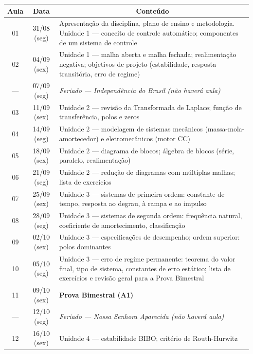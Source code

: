 \documentclass[oneside,a4paper,12pt]{article}
\begin{document}
	\clearpage
	\begin{longtable}{ |c|c|p{12.5cm}| }
	  \hline
	  \textbf{Aula}& \textbf{Data}  &  \multicolumn{1}{|c|}{\textbf{Conteúdo}} \\
	  \hline
	  \endhead
	   01 & 31/08 (seg) & Apresentação da disciplina, plano de ensino e metodologia. Unidade 1 --- conceito de controle automático; componentes de um sistema de controle \\
	  \hline
	   02 & 04/09 (sex) & Unidade 1 --- malha aberta e malha fechada; realimentação negativa; objetivos de projeto (estabilidade, resposta transitória, erro de regime) \\
	  \hline
	   --- & 07/09 (seg) & \textit{Feriado --- Independência do Brasil (não haverá aula)} \\
	  \hline
	   03 & 11/09 (sex) & Unidade 2 --- revisão da Transformada de Laplace; função de transferência, polos e zeros \\
	  \hline
	   04 & 14/09 (seg) & Unidade 2 --- modelagem de sistemas mecânicos (massa-mola-amortecedor) e eletromecânicos (motor CC) \\
	  \hline
	   05 & 18/09 (sex) & Unidade 2 --- diagrama de blocos; álgebra de blocos (série, paralelo, realimentação) \\
	  \hline
	   06 & 21/09 (seg) & Unidade 2 --- redução de diagramas com múltiplas malhas; lista de exercícios \\
	  \hline
	   07 & 25/09 (sex) & Unidade 3 --- sistemas de primeira ordem: constante de tempo, resposta ao degrau, à rampa e ao impulso \\
	  \hline
	   08 & 28/09 (seg) & Unidade 3 --- sistemas de segunda ordem: frequência natural, coeficiente de amortecimento, classificação \\
	  \hline
	   09 & 02/10 (sex) & Unidade 3 --- especificações de desempenho; ordem superior: polos dominantes \\
	  \hline
	   10 & 05/10 (seg) & Unidade 3 --- erro de regime permanente: teorema do valor final, tipo de sistema, constantes de erro estático; lista de exercícios e revisão geral para a Prova Bimestral \\
	  \hline
	   11 & 09/10 (sex) & \textbf{Prova Bimestral (A1)} \\
	  \hline
	   --- & 12/10 (seg) & \textit{Feriado --- Nossa Senhora Aparecida (não haverá aula)} \\
	  \hline
	   12 & 16/10 (sex) & Unidade 4 --- estabilidade BIBO; critério de Routh-Hurwitz \\

\end{longtable}
\end{document}
